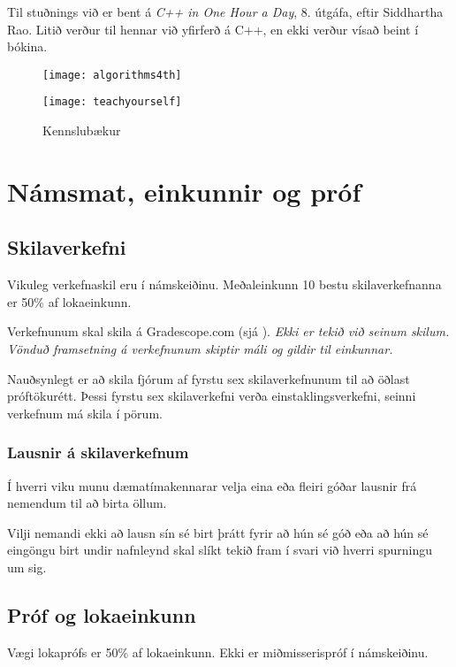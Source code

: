 \documentclass{article}
\begin{document}
Til stuðnings við er bent á \emph{C++ in One Hour a Day}, 8. útgáfa, eftir Siddhartha Rao. Litið verður til hennar við yfirferð á C++, en ekki verður vísað beint í bókina.

\begin{figure}
    \caption{Kennslubækur}
    \begin{multicols}{2}
    \begin{center}
    \texttt{[image: algorithms4th]}
    \end{center}
    
    \begin{center}
    \texttt{[image: teachyourself]}
    \end{center}
    \end{multicols}
\end{figure}

\newpage
\section{Námsmat, einkunnir og próf}
\subsection{Skilaverkefni}
Vikuleg verkefnaskil eru í námskeiðinu. Meðaleinkunn 10 bestu skilaverkefnanna er 50\% af lokaeinkunn. 

Verkefnunum skal skila á Gradescope.com (sjá ). \emph{Ekki er tekið við seinum skilum. Vönduð framsetning á verkefnunum skiptir máli og gildir til einkunnar.}

Nauðsynlegt er að skila fjórum af fyrstu sex skilaverkefnunum til að öðlast próftökurétt. Þessi fyrstu sex skilaverkefni verða einstaklingsverkefni, seinni verkefnum má skila í pörum.

\subsubsection{Lausnir á skilaverkefnum}

Í hverri viku munu dæmatímakennarar velja eina eða fleiri góðar lausnir frá nemendum til að birta öllum.

Vilji nemandi ekki að lausn sín sé birt þrátt fyrir að hún sé góð eða að hún sé eingöngu birt undir nafnleynd skal slíkt tekið fram í svari við hverri spurningu um sig.

\subsection{Próf og lokaeinkunn}
Vægi lokaprófs er 50\% af lokaeinkunn. Ekki er miðmisserispróf í námskeiðinu.
\end{document}
